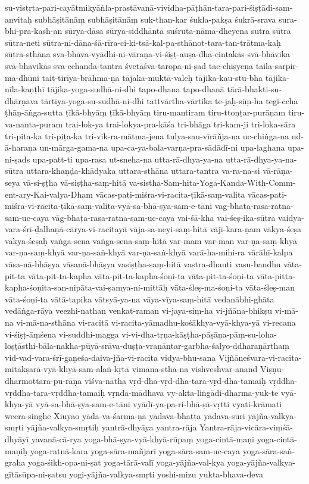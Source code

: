 {su-vistṛta-pari-cayātmikyāṅla-prastāvanā-vividha-pāṭhān-tara-pari-śiṣṭādi-sam-anvitaḥ
subhāṣitānāṃ
subhāṣitānāṃ
suk-than-kar
śukla-pakṣa
śukrā-srava
sura-bhi-pra-kash-an
sūrya-dāsa
sūrya-siddhānta
suśruta-nāma-dheyena
sutra
sūtra
sūtra-neti
sūtra-ni-dāna-śā-rīra-ci-ki-tsā-kal-pa-sthānot-tara-tan-trātma-kaḥ
sūtra-sthāna
sva-bhāva-vyādhi-ni-vāraṇa-vi-śiṣṭ-auṣa-dha-cintakās
svā-bhāvika
svā-bhāvikās
sva-cchanda-tantra
śvetāśva-taropa-ni-ṣad
tac-chiṣyeṇa
taila-sarpir-ma-dhūni
tait-tirīya-brāhma-ṇa
tājaka-muktā-valeḥ
tājika-kau-stu-bha
tājika-nīla-kaṇṭhī
tājika-yoga-sudhā-ni-dhi
tapo-dhana
tapo-dhanā
tārā-bhakti-su-dhārṇava
tārtīya-yoga-su-sudhā-ni-dhi
tattvārtha-vārtika
te-jaḥ-siṃ-ha
tegi-ccha
ṭhāṇ-āṅga-sutta
ṭīkā-bhyāṃ
ṭīkā-bhyāṃ
tiru-mantiram
tiru-ttoṇṭar-purāṇam
tiru-va-nanta-puram
trai-lok-ya
trai-lokya-pra-kāśa
tri-bhāga
tri-kam-ji
tri-loka-sāra
tri-pita-ka
tri-piṭa-ka
tri-vik-ra-mātma-jena
tulya-sau-vīrāñja-na
uc-chiṅga-na
ud-ā-haraṇa
un-mārga-gama-na
upa-ca-ya-bala-varṇa-pra-sādādī-ni
upa-laghana
upa-ni-ṣads
upa-patt-ti
upa-rasa
ut-sneha-na
utta-rā-dhya-ya-na
utta-rā-dhya-ya-na-sūtra
uttara-khaṇḍa-khādyaka
uttara-sthāna
uttara-tantra
va-ra-na-si
vā-rāṇa-seya
vā-si-ṣṭha
vā-siṣṭha-saṃ-hitā
va-sistha-Sam-hita-Yoga-Kanda-With-Comm-ent-ary-Kai-valya-Dham
vācas-pati-miśra-vi-racita-ṭīkā-saṃ-valita
vācas-pati-miśra-vi-racita-ṭīkā-saṃ-valita-vyā-sa-bhā-ṣya-sam-e-tāni
vag-bhata-rasa-ratna-sam-uc-caya
vāg-bhaṭa-rasa-ratna-sam-uc-caya
vai-śā-kha
vai-śeṣ-ika-sūtra
vaidya-vara-śrī-ḍalhaṇā-cārya-vi-racitayā
vāja-sa-neyi-saṃ-hitā
vājī-kara-ṇam
vākya-śeṣa
vākya-śeṣaḥ
vaṅga-sena
vaṅga-sena-saṃ-hitā
var-mam
var-man
var-ṇa-saṃ-khyā
var-ṇa-saṃ-khyā
var-ṇa-saṅ-khyā
var-ṇa-saṅ-khyā
varā-ha-mihi-ra
vārāhī-kalpa
vāsa-nā-bhāṣya
vāsanā-bhāṣya
vasiṣṭha-saṃ-hitā
vastra-dhauti
vasu-bandhu
vāta-pit-ta
vāta-pit-ta-kapha
vāta-pit-ta-kapha-śoṇi-ta
vāta-pit-ta-śoṇi-ta
vāta-pitta-kapha-śoṇita-san-nipāta-vai-ṣamya-ni-mittāḥ
vāta-śleṣ-ma-śoṇi-ta
vāta-śleṣ-man
vāta-śoṇi-ta
vātā-tapika
vātsyā-ya-na
vāya-vīya-saṃ-hitā
vedanābhi-ghāta
vedāṅga-rāya
veezhi-nathan
venkat-raman
vi-jaya-siṃ-ha
vi-jñāna-bhikṣu
vi-mā-na
vi-mā-na-sthāna
vi-racitā
vi-racita-yāmadhu-kośākhya-vyā-khya-yā
vi-recana
vi-śiṣṭ-āṃśena
vi-suddhi-magga
vi-vi-dha-tṛṇa-kāṣṭha-pāṣāṇa-pāṃ-su-loha-loṣṭāsthi-bāla-nakha-pūyā-srāva-duṣṭa-vraṇāntar-garbha-śalyo-ddharaṇārthaṃ
vid-vad-vara-śrī-gaṇeśa-daiva-jña-vi-racita
vidya-bhu-sana
Vijñāneśvara-vi-racita-mitākṣarā-vyā-khyā-sam-alaṅ-kṛtā
vimāna-sthā-na
vishveshvar-anand
Viṣṇu-dharmottara-pu-rāṇa
viśva-nātha
vṛd-dha-vṛd-dha-tara-vṛd-dha-tamaiḥ
vṛddha-vṛddha-tara-vṛddha-tamaiḥ
vṛnda-mādhava
vy-akta-liṅgādi-dharma-yuk-te
vyā-khya-yā
vyā-sa-bhā-ṣya-sam-e-tāni
vyāḍī-ya-pa-ri-bhā-ṣā-vṛtti
vyati-krāmati
weera-singhe
Xiuyao
yāda-va-śarma-ṇā
yādava-bhaṭṭa
yādava-sūri
yājña-valkya-smṛti
yājña-valkya-smṛtiḥ
yantrā-dhyāya
yantra-rāja
Yantra-rāja-vicāra-viṃśā-dhyāyī
yavanā-cā-rya
yoga-bhā-ṣya-vyā-khyā-rūpaṃ
yoga-cintā-maṇi
yoga-cintā-maṇiḥ
yoga-ratnā-kara
yoga-sāra-mañjarī
yoga-sāra-sam-uc-caya
yoga-sāra-saṅ-graha
yoga-śikh-opa-ni-ṣat
yoga-tārā-valī
yoga-yājña-val-kya
yoga-yājña-valkya-gītāsūpa-ni-ṣatsu
yogi-yājña-valkya-smṛti
yoshi-mizu
yukta-bhava-deva
}

